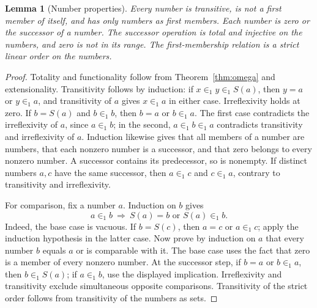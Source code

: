 \documentclass[11pt,a4paper]{article}
\numberwithin{equation}{section}
\newtheorem{lemma}[theorem]{Lemma}
\theoremstyle{definition}
\theoremstyle{remark}
\newcommand{\extone}{\in_1}
\begin{document}
\begin{lemma}[Number properties]\label{lem:numbers}
Every number is transitive, is not a first member of itself, and has only numbers as first members. Each number is zero or the successor of a number. The successor operation is total and injective on the numbers, and zero is not in its range. The first-membership relation is a strict linear order on the numbers.
\end{lemma}
\begin{proof}
Totality and functionality follow from Theorem~\ref{thm:omega} and extensionality. Transitivity follows by induction: if $x\extone y\extone S(a)$, then $y=a$ or $y\extone a$, and transitivity of $a$ gives $x\extone a$ in either case. Irreflexivity holds at zero. If $b=S(a)$ and $b\extone b$, then $b=a$ or $b\extone a$. The first case contradicts the irreflexivity of $a$, since $a\extone b$; in the second, $a\extone b\extone a$ contradicts transitivity and irreflexivity of $a$. Induction likewise gives that all members of a number are numbers, that each nonzero number is a successor, and that zero belongs to every nonzero number. A successor contains its predecessor, so is nonempty. If distinct numbers $a,c$ have the same successor, then $a\extone c$ and $c\extone a$, contrary to transitivity and irreflexivity.

For comparison, fix a number $a$. Induction on $b$ gives
\[a\extone b\ \Longrightarrow\ S(a)=b\text{ or }S(a)\extone b.\]
Indeed, the base case is vacuous. If $b=S(c)$, then $a=c$ or $a\extone c$; apply the induction hypothesis in the latter case. Now prove by induction on $a$ that every number $b$ equals $a$ or is comparable with it. The base case uses the fact that zero is a member of every nonzero number. At the successor step, if $b=a$ or $b\extone a$, then $b\extone S(a)$; if $a\extone b$, use the displayed implication. Irreflexivity and transitivity exclude simultaneous opposite comparisons. Transitivity of the strict order follows from transitivity of the numbers as sets.
\end{proof}
\end{document}
